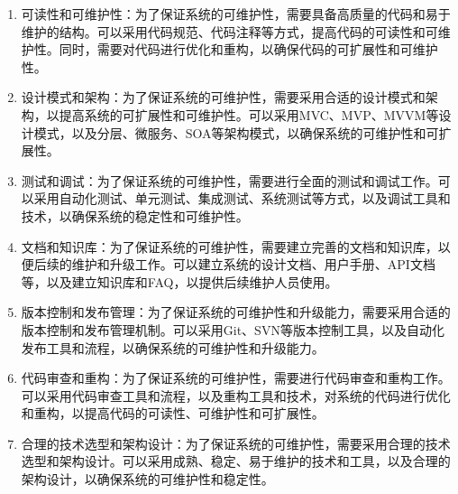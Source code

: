 \documentclass[UTF8]{ctexart}
\newcommand{\m}[1]{\textcolor{modify}{#1}}
\begin{document}
    \m{
        \begin{enumerate}
            \item 可读性和可维护性：为了保证系统的可维护性，需要具备高质量的代码和易于维护的结构。可以采用代码规范、代码注释等方式，提高代码的可读性和可维护性。同时，需要对代码进行优化和重构，以确保代码的可扩展性和可维护性。
            \item 设计模式和架构：为了保证系统的可维护性，需要采用合适的设计模式和架构，以提高系统的可扩展性和可维护性。可以采用MVC、MVP、MVVM等设计模式，以及分层、微服务、SOA等架构模式，以确保系统的可维护性和可扩展性。
            \item 测试和调试：为了保证系统的可维护性，需要进行全面的测试和调试工作。可以采用自动化测试、单元测试、集成测试、系统测试等方式，以及调试工具和技术，以确保系统的稳定性和可维护性。
            \item 文档和知识库：为了保证系统的可维护性，需要建立完善的文档和知识库，以便后续的维护和升级工作。可以建立系统的设计文档、用户手册、API文档等，以及建立知识库和FAQ，以提供后续维护人员使用。
            \item 版本控制和发布管理：为了保证系统的可维护性和升级能力，需要采用合适的版本控制和发布管理机制。可以采用Git、SVN等版本控制工具，以及自动化发布工具和流程，以确保系统的可维护性和升级能力。
            \item 代码审查和重构：为了保证系统的可维护性，需要进行代码审查和重构工作。可以采用代码审查工具和流程，以及重构工具和技术，对系统的代码进行优化和重构，以提高代码的可读性、可维护性和可扩展性。
            \item 合理的技术选型和架构设计：为了保证系统的可维护性，需要采用合理的技术选型和架构设计。可以采用成熟、稳定、易于维护的技术和工具，以及合理的架构设计，以确保系统的可维护性和稳定性。
        \end{enumerate}
    }
    
\end{document}
